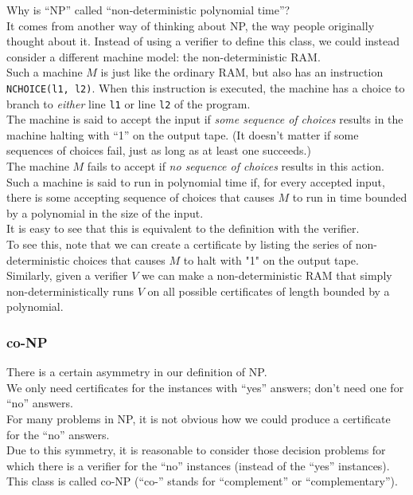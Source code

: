 \documentclass[12pt]{article}
\theoremstyle{plain}
\theoremstyle{definition}
\begin{document}
Why is ``NP'' called ``non-deterministic polynomial time''? \\
It comes from another way of thinking about NP, the way people originally thought about it.
Instead of using a verifier to define this class, we could instead consider a different machine model: the non-deterministic RAM. \\
Such a machine $M$ is just like the ordinary RAM, but also has an instruction \texttt{NCHOICE(l1, l2)}.
When this instruction is executed, the machine has a choice to branch to \emph{either} line \texttt{l1} or line \texttt{l2} of the program. \\
The machine is said to accept the input if \emph{some sequence of choices} results in the machine halting with ``1'' on the output tape. (It doesn't matter if some sequences of choices fail, just as long as at least one succeeds.) \\
The machine $M$ fails to accept if \emph{no sequence of choices} results in this action. \\
Such a machine is said to run in polynomial time if, for every accepted input, there is some accepting sequence of choices that causes $M$ to run in time bounded by a polynomial in the size of the input. \\
It is easy to see that this is equivalent to the definition with the verifier. \\

To see this, note that we can create a certificate by listing the series of non-deterministic choices that causes $M$ to halt with "1" on the output tape. \\
Similarly, given a verifier $V$ we can make a non-deterministic RAM that simply non-deterministically runs $V$ on all possible certificates of length bounded by a polynomial.

\subsubsection{co-NP}
There is a certain asymmetry in our definition of NP. \\
We only need certificates for the instances with ``yes'' answers;
don't need one for ``no'' answers. \\
For many problems in NP, it is not obvious how we could produce a certificate for the ``no'' answers. \\

Due to this symmetry, it is reasonable to consider those decision problems for which there is a verifier for the ``no'' instances (instead of the ``yes'' instances). \\
This class is called co-NP (``co-'' stands for ``complement'' or ``complementary''). \\
\end{document}
